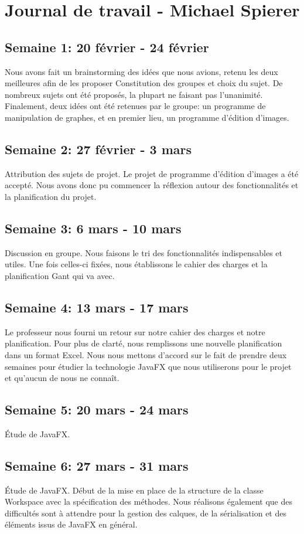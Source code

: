 \section{Journal de travail - Michael Spierer}

\subsection{Semaine 1: 20 février - 24 février}
Nous avons fait un brainstorming des idées que nous avions, retenu les deux meilleures afin de les proposer
Constitution des groupes et choix du sujet. De nombreux sujets ont été proposés, la plupart ne faisant pas l'unanimité. Finalement, deux idées ont été retenues par le groupe: un programme de manipulation de graphes, et en premier lieu, un programme d'édition d'images.
\subsection{Semaine 2: 27 février - 3 mars}
Attribution des sujets de projet. Le projet de programme d'édition d'images a été accepté. Nous avons donc pu commencer la réflexion autour des fonctionnalités et la planification du projet.
\subsection{Semaine 3: 6 mars - 10 mars}
Discussion en groupe. Nous faisons le tri des fonctionnalités indispensables et utiles. Une fois celles-ci fixées, nous établissons le cahier des charges et la planification Gant qui va avec.
\subsection{Semaine 4: 13 mars - 17 mars}
Le professeur nous fourni un retour sur notre cahier des charges et notre planification. Pour plus de clarté, nous remplissons une nouvelle planification dans un format Excel. Nous nous mettons d'accord sur le fait de prendre deux semaines pour étudier la technologie JavaFX que nous utiliserons pour le projet et qu'aucun de nous ne connaît.
\subsection{Semaine 5: 20 mars - 24 mars}
Étude de JavaFX.
\subsection{Semaine 6: 27 mars - 31 mars}
Étude de JavaFX. Début de la mise en place de la structure de la classe Workspace avec la spécification des méthodes. Nous réalisons également que des difficultés sont à attendre pour la gestion des calques, de la sérialisation et des éléments issus de JavaFX en général.
